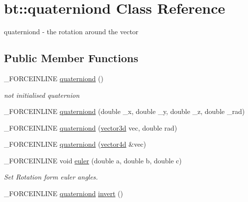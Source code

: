 \hypertarget{classbt_1_1quaterniond}{\section{bt\-:\-:quaterniond Class Reference}
\label{classbt_1_1quaterniond}
}


quaterniond -\/ the rotation around the vector  


\subsection*{Public Member Functions}
\begin{DoxyCompactItemize}
\item 
\hypertarget{classbt_1_1quaterniond_adc1d62bf6b0dde15661db604be829db4}{\-\_\-\-F\-O\-R\-C\-E\-I\-N\-L\-I\-N\-E \hyperlink{classbt_1_1quaterniond_adc1d62bf6b0dde15661db604be829db4}{quaterniond} ()}\label{classbt_1_1quaterniond_adc1d62bf6b0dde15661db604be829db4}

\begin{DoxyCompactList}\small\item\em not initialised quaternion \end{DoxyCompactList}\item 
\-\_\-\-F\-O\-R\-C\-E\-I\-N\-L\-I\-N\-E \hyperlink{classbt_1_1quaterniond_aaa9a2c81f896537335d793be8dd10117}{quaterniond} (double \-\_\-x, double \-\_\-y, double \-\_\-z, double \-\_\-rad)
\item 
\-\_\-\-F\-O\-R\-C\-E\-I\-N\-L\-I\-N\-E \hyperlink{classbt_1_1quaterniond_a70d129401b8fd23d1f1ca2a415b62880}{quaterniond} (\hyperlink{classbt_1_1vector3d}{vector3d} vec, double rad)
\item 
\-\_\-\-F\-O\-R\-C\-E\-I\-N\-L\-I\-N\-E \hyperlink{classbt_1_1quaterniond_aa01ad633cef0ffcd60479d393b809219}{quaterniond} (\hyperlink{classbt_1_1vector4d}{vector4d} \&vec)
\item 
\hypertarget{classbt_1_1quaterniond_a5db4cb28d8e92386700d8c5b3893c47e}{\-\_\-\-F\-O\-R\-C\-E\-I\-N\-L\-I\-N\-E void \hyperlink{classbt_1_1quaterniond_a5db4cb28d8e92386700d8c5b3893c47e}{euler} (double a, double b, double c)}\label{classbt_1_1quaterniond_a5db4cb28d8e92386700d8c5b3893c47e}

\begin{DoxyCompactList}\small\item\em Set Rotation form euler angles. \end{DoxyCompactList}\item 
\hypertarget{classbt_1_1quaterniond_ad996d1d22a42256a58b3c803359edebd}{\-\_\-\-F\-O\-R\-C\-E\-I\-N\-L\-I\-N\-E \hyperlink{classbt_1_1quaterniond}{quaterniond} \hyperlink{classbt_1_1quaterniond_ad996d1d22a42256a58b3c803359edebd}{invert} ()}\label{classbt_1_1quaterniond_ad996d1d22a42256a58b3c803359edebd}


\end{DoxyCompactItemize}
